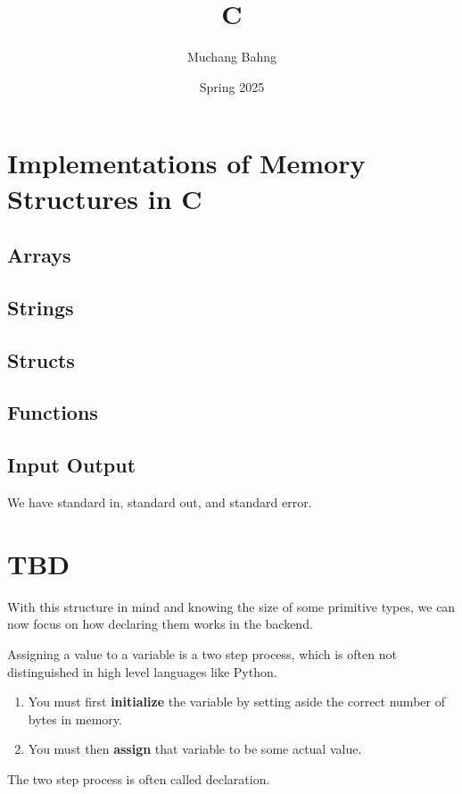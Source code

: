\documentclass{article}
\begin{document}
\title{C}
\author{Muchang Bahng}
\date{Spring 2025}

\maketitle
\tableofcontents
\pagebreak

\section{Implementations of Memory Structures in C} 

  \subsection{Arrays}

  \subsection{Strings}

  \subsection{Structs}

  \subsection{Functions}

  \subsection{Input Output}
    
    We have standard in, standard out, and standard error. 


\section{TBD} 

  With this structure in mind and knowing the size of some primitive types, we can now focus on how declaring them works in the backend. 

  \begin{definition}
    Assigning a value to a variable is a two step process, which is often not distinguished in high level languages like Python. 
    \begin{enumerate}
      \item You must first \textbf{initialize} the variable by setting aside the correct number of bytes in memory. 
      \item You must then \textbf{assign} that variable to be some actual value. 
    \end{enumerate}
    The two step process is often called declaration. 
  \end{definition}
\end{document}
